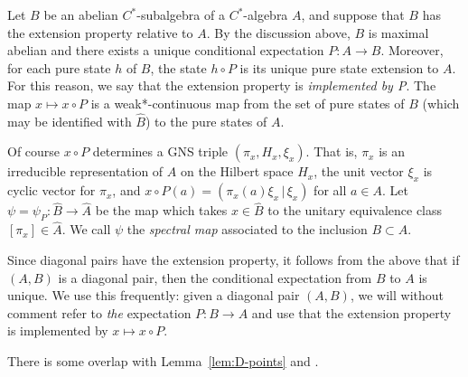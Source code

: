\documentclass[12pt,a4paper]{amsart}
\newcommand{\Hh}{{H}}
\begin{document}
\begin{notation+h}\label{rmk:def-psi}
Let $B$ be an abelian $C^*$-subalgebra of a $C^*$-algebra $A$,
and suppose that $B$ has the extension property relative to $A$.
By the discussion above, $B$ is maximal abelian and there exists
a unique conditional expectation $P:A \to B$. Moreover, for each
pure state $h$ of $B$, the state  $h\circ P$ is its unique pure
state extension to $A$. For this reason, we say that the
extension property is \emph{implemented by P}. The map $x
\mapsto x\circ P$ is a weak*-continuous map from the set of pure
states of $B$ (which may be identified with $\widehat{B}$) to
the pure states of $A$.

Of course $x \circ P$  determines a GNS triple $(\pi_x,
\Hh_x, \xi_x)$. That is, $\pi_{x}$ is an irreducible
representation of $A$ on the Hilbert space $\Hh_x$, the unit
vector $\xi_x$ is cyclic vector for $\pi_x$, and $x\circ P(a) =
(\pi_{x}(a)\xi_x\,|\, \xi_x)$ for all $a \in A$. Let $\psi =
\psi_P : \widehat{B} \to \widehat{A}$ be the map which takes $x
\in \widehat{B}$ to the unitary equivalence class $[\pi_{x}] \in
\widehat{A}$.  We call $\psi$ the \emph{spectral map} associated
to the inclusion $B \subset A$.

Since diagonal pairs have the extension property, it follows
from the above that if $(A,B)$ is a diagonal pair, then the
conditional expectation from $B$ to $A$ is unique. We use this
frequently: given a diagonal pair $(A,B)$, we will
without comment refer to \emph{the} expectation $P:B\to A$ and
use that the extension property is implemented by $x
\mapsto x \circ P$.
\end{notation+h}

There is some overlap with Lemma~\ref{lem:D-points} and \cite[Proposition~2.10]{A}.
\end{document}
